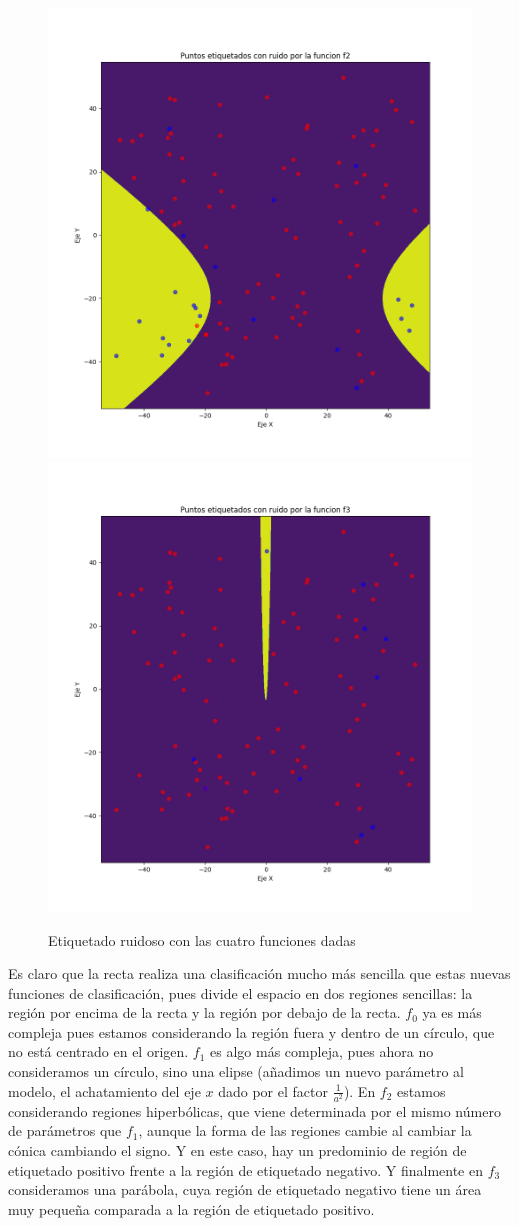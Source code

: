 \documentclass[11pt]{article}
\begin{document}
\begin{figure}[H]
    \includegraphics[width=0.60 \textwidth]{puntos_clasificados_f2.png}
    \includegraphics[width=0.60 \textwidth]{puntos_clasificados_f3.png}

    \caption{Etiquetado ruidoso con las cuatro funciones dadas}
\end{figure}

Es claro que la recta realiza una clasificación mucho más sencilla que estas nuevas funciones de clasificación, pues divide el espacio en dos regiones sencillas: la región por encima de la recta y la región por debajo de la recta. $f_0$ ya es más compleja pues estamos considerando la región fuera y dentro de un círculo, que no está centrado en el origen. $f_1$ es algo más compleja, pues ahora no consideramos un círculo, sino una elipse (añadimos un nuevo parámetro al modelo, el achatamiento del eje $x$ dado por el factor $\frac{1}{a^2}$). En $f_2$ estamos considerando regiones hiperbólicas, que viene determinada por el mismo número de parámetros que $f_1$, aunque la forma de las regiones cambie al cambiar la cónica cambiando el signo. Y en este caso, hay un predominio de región de etiquetado positivo frente a la región de etiquetado negativo. Y finalmente en $f_3$ consideramos una parábola, cuya región de etiquetado negativo tiene un área muy pequeña comparada a la región de etiquetado positivo.
\end{document}
